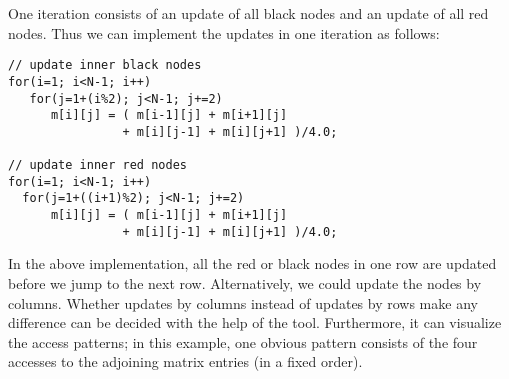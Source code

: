 One iteration consists of an update of all black nodes and an update of all red nodes. Thus we can implement the updates in one iteration as follows:
\begin{lstlisting}
// update inner black nodes
for(i=1; i<N-1; i++)
   for(j=1+(i%2); j<N-1; j+=2)
      m[i][j] = ( m[i-1][j] + m[i+1][j] 
                + m[i][j-1] + m[i][j+1] )/4.0;

// update inner red nodes
for(i=1; i<N-1; i++)
  for(j=1+((i+1)%2); j<N-1; j+=2)
      m[i][j] = ( m[i-1][j] + m[i+1][j] 
                + m[i][j-1] + m[i][j+1] )/4.0;
\end{lstlisting}
In the above implementation, all the red or black nodes in one row are updated before we jump to the next row. Alternatively, we could update the nodes by columns. Whether updates by columns instead of updates by rows make any difference can be decided with the help of the tool. Furthermore, it can visualize the access patterns; in this example, one obvious pattern consists of the four accesses to the adjoining matrix entries (in a fixed order).

